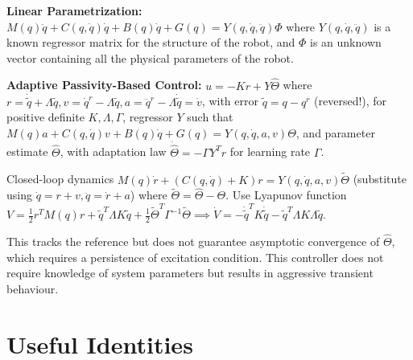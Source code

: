 \documentclass[twocolumn, 8pt]{extarticle}
\begin{document}
\textbf{Linear Parametrization:} \(M(q)\ddot q + C(q, \dot q)\dot q + B(q)\dot q + G(q) = Y(q, \dot q, \ddot q)\Phi\)
where \(Y(q, \dot q, \ddot q)\) is a known regressor matrix for the structure of the robot, and \(\Phi\) is an unknown
vector containing all the physical parameters of the robot.

\textbf{Adaptive Passivity-Based Control:} \(u = -Kr + Y\hat\Theta\) where \(r =
\dot{\tilde q} + \Lambda\tilde q, v = \dot q^r - \Lambda\tilde q, a = \ddot q^r - \Lambda\dot{\tilde q} = \dot v\), with
error \(\tilde q = q - q^r\) (reversed!), for positive definite \(K, \Lambda, \Gamma\), regressor \(Y\) such that
\(M(q)a + C(q, \dot q)v + B(q)\dot q + G(q) = Y(q, \dot q, a, v)\Theta\), and parameter estimate \(\hat\Theta\), with
adaptation law \(\dot{\hat\Theta} = -\Gamma Y^Tr\) for learning rate \(\Gamma\).

Closed-loop dynamics \(M(q)\dot r + (C(q, \dot q) + K)r = Y(q, \dot q, a, v)\tilde\Theta\) (substitute using
\(\dot q = r + v, \ddot q = \dot r + a\)) where \(\tilde\Theta = \hat\Theta - \Theta\).
Use Lyapunov function \( V = \frac{1}{2}r^TM(q)r + \tilde q^T\Lambda K\tilde q + \frac{1}{2}\tilde\Theta^T\Gamma^{-1}\tilde\Theta
\implies \dot V = -\dot{\tilde q}^TK\dot{\tilde q} - \tilde q^T\Lambda K\Lambda\tilde q\).

This tracks the reference but does not guarantee asymptotic convergence of \(\hat\Theta\), which requires a persistence
of excitation condition. This controller does not require knowledge of system parameters but results in aggressive
transient behaviour.

\section{Useful Identities}
\end{document}
